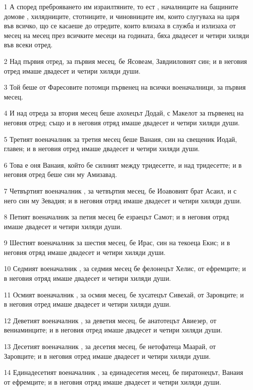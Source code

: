 \par 1 А според преброяването им израилтяните, то ест , началниците на бащините домове , хилядниците, стотниците, и чиновниците им, които слугуваха на царя във всичко, що се касаеше до отредите, които влизаха в служба и излизаха от месец на месец през всичките месеци на годината, бяха двадесет и четири хиляди във всеки отред.
\par 2 Над първия отред, за първия месец, бе Ясовеам, Завдииловият син; и в неговия отред имаше двадесет и четири хиляди души.
\par 3 Той беше от Фаресовите потомци първенец на всички военачалници, за първия месец.
\par 4 И над отреда за втория месец беше ахохецът Додай, с Макелот за първенец на неговия отред; също и в неговия отряд имаше двадесет и четири хиляди души.
\par 5 Третият военачалник за третия месец беше Ванаия, син на свещеник Иодай, главен; и в неговия отред имаше двадесет и четири хиляди души.
\par 6 Това е оня Ванаия, който бе силният между тридесетте, и над тридесетте; и в неговия отред беше син му Амизавад.
\par 7 Четвъртият военачалник , за четвъртия месец, бе Иоавовият брат Асаил, и с него син му Зевадия; и в неговия отряд имаше двадесет и четири хиляди души.
\par 8 Петият военачалник за петия месец бе езраецът Самот; и в неговия отряд имаше двадесет и четири хиляди души.
\par 9 Шестият военачалник за шестия месец, бе Ирас, син на текоеца Екис; и в неговия отряд имаше двадесет и четири хиляди души.
\par 10 Седмият военачалник , за седмия месец бе фелонецът Хелис, от ефремците; и в неговия отряд имаше двадесет и четири хиляди души.
\par 11 Осмият военачалник , за осмия месец, бе хусатецът Сивехай, от Заровците; и в неговия отред имаше двадесет и четири хиляди души.
\par 12 Деветият военачалник , за деветия месец, бе анатотецът Авиезер, от вениаминците; и в неговия отред имаше двадесет и четири хиляди души.
\par 13 Десетият военачалник , за десетия месец, бе нетофатеца Маарай, от Заровците; и в неговия отред имаше двадесет и четири хиляди души.
\par 14 Единадесетият военачалник , за единадесетия месец, бе пиратонецът, Ванаия от ефремците; и в неговия отряд имаше двадесет и четири хиляди души.
